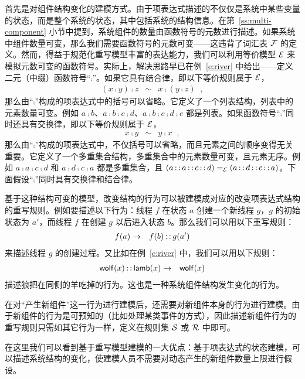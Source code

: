 首先是对组件结构变化的建模方式。由于项表达式描述的不仅仅是系统中某些变量的状态，而是整个系统的状态，其中包括系统的结构信息。在第~\ref{ss:multi-component} 小节中提到，系统组件的数量由函数符号的元数进行描述。如果系统中组件数量可变，那么我们需要函数符号的元数可变——这违背了词汇表 $\mathcal{F}$ 的定义。然而，得益于规范化重写模型丰富的表达能力，我们可以利用等价模型 $\mathcal{E}$ 来模拟元数可变的函数符号。实际上，解决思路早已在例~\ref{e:river} 中给出——定义二元（中缀）函数符号“$\comp$”。如果它具有结合律，即以下等价规则属于 $\mathcal{E}$，
\begin{eqnarray}
 (x\comp y) \comp z & \sim & x \comp (y\comp z)\;\; , \nonumber
\end{eqnarray}
那么由“$\comp$”构成的项表达式中的括号可以省略。它定义了一个列表结构，列表中的元素数量可变。例如 $a\comp b$、$a\comp b\comp c\comp d$、$a\comp b\comp c\comp d\comp e$ 都是列表。如果函数符号“$\comp$”同时还具有交换律，即以下等价规则属于 $\mathcal{E}$，
\begin{eqnarray}
 x\comp y & \sim & y\comp x\;\; , \nonumber
\end{eqnarray}
那么由“$\comp$”构成的项表达式中，不仅括号可以省略，而且元素之间的顺序变得无关重要。它定义了一个多重集合结构，多重集合中的元素数量可变，且元素无序。例如 $a\comp a\comp c\comp d$ 和 $a\comp d\comp c\comp a$ 都是多重集合，且 $(a\operatorname{\mathsf{::}} a\operatorname{\mathsf{::}} c\operatorname{\mathsf{::}} d) =_{\mathcal{E}} (a\operatorname{\mathsf{::}} d\operatorname{\mathsf{::}} c\operatorname{\mathsf{::}} a)$。下面假设“$\comp$”同时具有交换律和结合律。

基于这种结构可变的模型，改变结构的行为可以被建模成对应的改变项表达式结构的重写规则。例如要描述以下行为：线程 $f$ 在状态 $a$ 创建一个新线程 $g$，$g$ 的初始状态为 $a'$，而线程 $f$ 在创建 $g$ 以后进入状态 $b$。那么我们可以用以下重写规则：
\begin{eqnarray}
f(a) & \rightarrow & f(b) \operatorname{\mathsf{::}} g(a') \nonumber
\end{eqnarray}
来描述线程 $g$ 的创建过程。又比如在例~\ref{e:river} 中，我们可以用以下规则：
\begin{eqnarray}
\operatorname{\mathsf{wolf}}(x)\operatorname{\mathsf{::}}\operatorname{\mathsf{lamb}}(x) & \rightarrow & \operatorname{\mathsf{wolf}}(x) \nonumber
\end{eqnarray}
描述狼把在同侧的羊吃掉的行为。这也是一种系统组件结构发生变化的行为。

在对“产生新组件”这一行为进行建模后，还需要对新组件本身的行为进行建模。由于新组件的行为是可预知的（比如处理某类事件的方式），因此描述新组件行为的重写规则只需如其它行为一样，定义在规则集 $\mathcal{S}$ 或 $\mathcal{R}$ 中即可。

在这里我们可以看到基于重写模型建模的一大优点：基于项表达式的状态建模，可以描述系统结构的变化，使建模人员不需要对动态产生的新组件数量上限进行假设。

